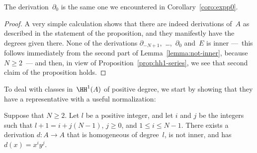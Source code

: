 The derivation~$\partial_0$ is the same one we encountered in
Corollary~\ref{coro:expp0}.

\begin{proof}
A very simple calculation shows that there are indeed derivations of~$A$ as
described in the statement of the proposition, and they manifestly have the
degrees given there. None of the derivations
$\partial_{-N+1}$,~\dots,~$\partial_0$ and~$E$ is inner ---~this follows
immediately from the second part of Lemma~\ref{lemma:not-inner}, because
$N\geq2$~--- and then, in view of Proposition~\ref{prop:hh1-series}, we see
that second claim of the proposition holds.
\end{proof}

To deal with classes in~$\HH^1(A)$ of positive degree, we start by showing
that they have a representative with a useful normalization:

\begin{Lemma}\label{lemma:normalization}
Suppose that $N\geq2$. Let $l$ be a positive integer, and let $i$ and $j$
be the integers such that $l+1=i+j(N-1)$, $j\geq0$, and $1\leq i\leq
N-1$. There exists a derivation $d:A\to A$ that is homogeneous of
degree~$l$, is not inner, and has $d(x)  = x^iy^j$.
\end{Lemma}

